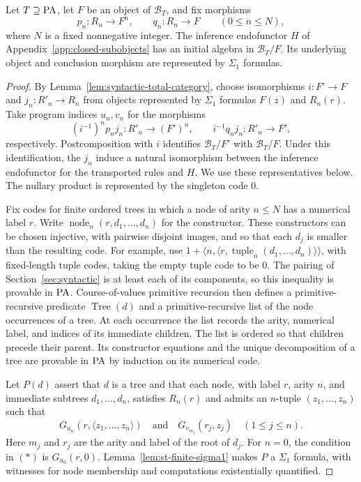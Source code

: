 \begin{lemma}\label{lem:syntactic-derivation-initiality}
Let $T\supseteq\mathrm{PA}$, let $F$ be an object of $\mathcal B_T$, and
fix morphisms
\[
 p_n:R_n\longrightarrow F^n,\qquad
 q_n:R_n\longrightarrow F\qquad(0\leq n\leq N),
\]
where $N$ is a fixed nonnegative integer.
The inference endofunctor $H$ of
Appendix~\ref{app:closed-subobjects} has an initial algebra in
$\mathcal B_T/F$.  Its underlying object and conclusion morphism
are represented by $\Sigma_1$ formulas.
\end{lemma}
\begin{proof}
By Lemma~\ref{lem:syntactic-total-category}, choose isomorphisms
$i:F'\to F$ and $j_n:R'_n\to R_n$ from objects represented by
$\Sigma_1$ formulas $F(z)$ and $R_n(r)$. Take program indices
$u_n,v_n$ for the morphisms
\[
 (i^{-1})^n p_n j_n:R'_n\longrightarrow (F')^n,\qquad
 i^{-1}q_n j_n:R'_n\longrightarrow F',
\]
respectively. Postcomposition with $i$ identifies $\mathcal B_T/F'$
with $\mathcal B_T/F$. Under this identification, the $j_n$ induce
a natural isomorphism between the inference endofunctor for the
transported rules and $H$. We use these representatives below. The
nullary product is represented by the singleton code $0$.

Fix codes for finite ordered trees in which a node of arity
$n\leq N$ has a numerical label $r$. Write
$\operatorname{node}_n(r,d_1,\ldots,d_n)$ for the constructor.
These constructors can be chosen injective,
with pairwise disjoint images, and so that each $d_j$ is smaller
than the resulting code.  For example, use
$1+\langle n,\langle r,\operatorname{tuple}_n(d_1,\ldots,d_n)
\rangle\rangle$, with fixed-length tuple codes, taking the empty
tuple code to be $0$.  The pairing of Section~\ref{sec:syntactic}
is at least each of its components, so this inequality is provable
in $\mathrm{PA}$.
Course-of-values primitive recursion then defines a
primitive-recursive predicate $\operatorname{Tree}(d)$ and a
primitive-recursive list of the node occurrences of a tree.  At
each occurrence the list records the arity, numerical label, and
indices of its immediate children.  The list is ordered so that
children precede their parent.  Its constructor equations and
the unique decomposition of a tree are provable in $\mathrm{PA}$ by
induction on its numerical code.

Let $P(d)$ assert that $d$ is a tree and that each node, with label $r$,
arity $n$, and immediate subtrees $d_1,\ldots,d_n$, satisfies $R_n(r)$
and admits an $n$-tuple $(z_1,\ldots,z_n)$ such that
\[
 G_{u_n}(r,\langle z_1,\ldots,z_n\rangle)
 \quad\text{and}\quad
 G_{v_{m_j}}(r_j,z_j)\quad(1\leq j\leq n).
 \tag{\(*\)}
\]
Here $m_j$ and $r_j$ are the arity and label of the root of
$d_j$.  For $n=0$, the condition in \((*)\) is
$G_{u_0}(r,0)$.
Lemma~\ref{lem:st-finite-sigma1} makes $P$ a $\Sigma_1$
formula, with witnesses for node membership and computations existentially
quantified.


\end{proof}
